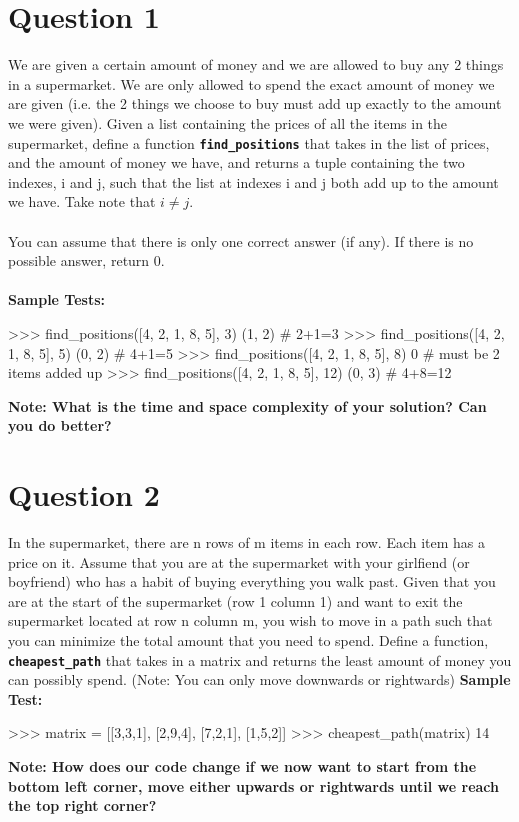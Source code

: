 \section{Question 1}
We are given a certain amount of money and we are allowed to buy any 2 things in a
supermarket. We are only allowed to spend the exact amount of money we are given
(i.e. the 2 things we choose to buy must add up exactly to the amount we were given).
Given a list containing the prices of all the items in the supermarket, define a function
\texttt{\bfseries find\_positions} that takes in the list of prices, and the amount of money we have,
and returns a tuple containing the two indexes, i and j, such that the list at indexes i and
j both add up to the amount we have. Take note that $i \neq j$. \\ \\
You can assume that there is only one correct answer (if any). If there is no possible
answer, return 0. \\ \\
\textbf{Sample Tests:}
\begin{python}
>>> find_positions([4, 2, 1, 8, 5], 3)
(1, 2)  # 2+1=3
>>> find_positions([4, 2, 1, 8, 5], 5)
(0, 2)  # 4+1=5
>>> find_positions([4, 2, 1, 8, 5], 8)
0       # must be 2 items added up
>>> find_positions([4, 2, 1, 8, 5], 12)
(0, 3)  # 4+8=12
\end{python}
\textbf{Note: What is the time and space complexity of your solution? Can you do better?}

\section{Question 2}
In the supermarket, there are n rows of m items in each row. Each item has a price
on it. Assume that you are at the supermarket with your girlfiend (or boyfriend) who has a habit of
buying everything you walk past. Given that you are at the start of the supermarket (row
1 column 1) and want to exit the supermarket located at row n column m, you wish to move in a
path such that you can minimize the total amount that you need to spend. Define a
function, \texttt{\bfseries cheapest\_path} that takes in a matrix and returns the least amount of
money you can possibly spend. (Note: You can only move downwards or rightwards)
\newpage
\textbf{Sample Test:}
\begin{python}
>>> matrix = [[3,3,1],
              [2,9,4],
              [7,2,1],
              [1,5,2]]
>>> cheapest_path(matrix)
14
\end{python}
\textbf{Note: How does our code change if we now want to start from the bottom left
corner, move either upwards or rightwards until we reach the top right corner?}


